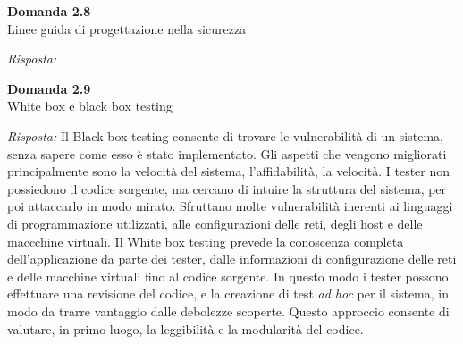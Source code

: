 \documentclass{article}
\newenvironment{problem}[2][Domanda]
    { \begin{mdframed}[backgroundcolor=gray!20] \textbf{#1 #2} \\}
    {  \end{mdframed}}
\newenvironment{solution}
    {\textit{Risposta:}}
    {}
\begin{document}
\begin{problem}{2.8}
Linee guida di progettazione nella sicurezza
\end{problem}
\begin{solution}

\end{solution}

\begin{problem}{2.9}
White box e black box testing
\end{problem}
\begin{solution}
Il Black box testing consente di trovare le vulnerabilità di un sistema, senza sapere come esso è stato implementato.
Gli aspetti che vengono migliorati principalmente sono la velocità del sistema, l'affidabilità, la velocità.
I tester non possiedono il codice sorgente, ma cercano di intuire la struttura del sistema, per poi attaccarlo in modo mirato.
\newline
Sfruttano molte vulnerabilità inerenti ai linguaggi di programmazione utilizzati, alle configurazioni delle reti, degli host e delle maccchine virtuali.
\newline
Il White box testing prevede la conoscenza completa dell'applicazione da parte dei tester, dalle informazioni di configurazione delle reti e delle macchine virtuali fino al codice sorgente.
In questo modo i tester possono effettuare una revisione del codice, e la creazione di test \textit{ad hoc} per il sistema, in modo da trarre vantaggio dalle debolezze scoperte.
Questo approccio consente di valutare, in primo luogo, la leggibilità e la modularità del codice.
\end{solution}
\end{document}
